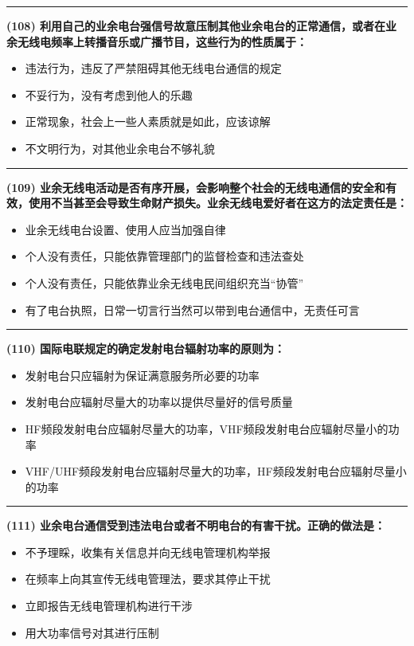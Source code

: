 \documentclass[twocolumn]{ctexart}  %
\begin{document}
\noindent\rule{0.5\textwidth}{1pt}
\heiti \textbf{(108) 利用自己的业余电台强信号故意压制其他业余电台的正常通信，或者在业余无线电频率上转播音乐或广播节目，这些行为的性质属于：} \songti {\color{gray} [LK0072] }
\begin{itemize}
	\item  违法行为，违反了严禁阻碍其他无线电台通信的规定
	\item  不妥行为，没有考虑到他人的乐趣
	\item  正常现象，社会上一些人素质就是如此，应该谅解
	\item  不文明行为，对其他业余电台不够礼貌
\end{itemize}


\noindent\rule{0.5\textwidth}{1pt}
\heiti \textbf{(109) 业余无线电活动是否有序开展，会影响整个社会的无线电通信的安全和有效，使用不当甚至会导致生命财产损失。业余无线电爱好者在这方的法定责任是：} \songti {\color{gray} [LK0073] }
\begin{itemize}
	\item  业余无线电台设置、使用人应当加强自律
	\item  个人没有责任，只能依靠管理部门的监督检查和违法查处
	\item  个人没有责任，只能依靠业余无线电民间组织充当“协管”
	\item  有了电台执照，日常一切言行当然可以带到电台通信中，无责任可言
\end{itemize}


\noindent\rule{0.5\textwidth}{1pt}
\heiti \textbf{(110) 国际电联规定的确定发射电台辐射功率的原则为：} \songti {\color{gray} [LK0181] }
\begin{itemize}
	\item  发射电台只应辐射为保证满意服务所必要的功率
	\item  发射电台应辐射尽量大的功率以提供尽量好的信号质量
	\item  HF频段发射电台应辐射尽量大的功率，VHF频段发射电台应辐射尽量小的功率
	\item  VHF/UHF频段发射电台应辐射尽量大的功率，HF频段发射电台应辐射尽量小的功率
\end{itemize}


\noindent\rule{0.5\textwidth}{1pt}
\heiti \textbf{(111) 业余电台通信受到违法电台或者不明电台的有害干扰。正确的做法是：} \songti {\color{gray} [LK0247] }
\begin{itemize}
	\item  不予理睬，收集有关信息并向无线电管理机构举报
	\item  在频率上向其宣传无线电管理法，要求其停止干扰
	\item  立即报告无线电管理机构进行干涉
	\item  用大功率信号对其进行压制
\end{itemize}
\end{document}
